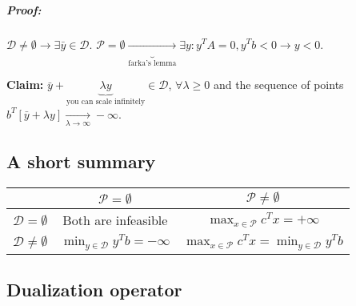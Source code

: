 \documentclass[main]{subfiles}
\begin{document}
\subparagraph{Proof:}
$\mathcal{D} \neq \emptyset \rightarrow \exists \bar{y} \in \mathcal{D}$.
$\mathcal{P} = \emptyset \underbrace{\rightarrow}_{\text{farka's lemma}} 
\exists y: y^T A = 0, y^T b < 0 \rightarrow y < 0$.

\textbf{Claim:} $\bar{y} + \underbrace{\lambda y}_{\text{you can scale
infinitely}} \in \mathcal{D}$, $\forall \lambda \geq 0$ and the sequence of
points $b^T [\bar{y} + \lambda y] \xrightarrow[\lambda \to \infty]{} -\infty$.


\subsection{A short summary}

\begin{center}
 \begin{tabular}{||c c c||} 
 \hline
 & $\mathcal{P} = \emptyset$ & $\mathcal{P} \neq \emptyset$ \\ [0.5ex] 
 \hline\hline
 $\mathcal{D} = \emptyset$ & Both are infeasible &  $\displaystyle \max_{x \in 
 \mathcal{P}} c^{T} x = +\infty$ \\ 
 \hline
 $\mathcal{D} \neq \emptyset$ & $\displaystyle \min_{y \in \mathcal{D}} y^{T}
 b = -\infty$ & $\displaystyle \max_{x \in \mathcal{P}} c^{T} x =
 \displaystyle \min_{y \in \mathcal{D}} y^{T} b$ \\
 \hline
\end{tabular}
\end{center}

\subsection{Dualization operator}
\end{document}

